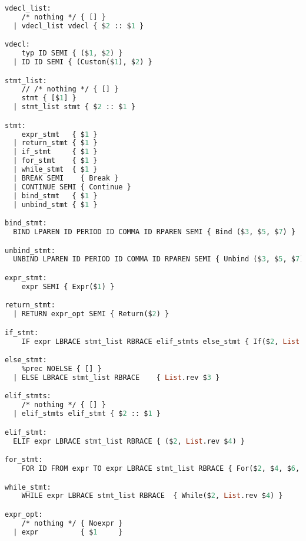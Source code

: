 \begin{lstlisting}[language=Caml,backgroundcolor=\color{backgroundcolor}]
vdecl_list:
    /* nothing */ { [] }
  | vdecl_list vdecl { $2 :: $1 }

vdecl:
    typ ID SEMI { ($1, $2) }
  | ID ID SEMI { (Custom($1), $2) }

stmt_list:
    // /* nothing */ { [] }
    stmt { [$1] }
  | stmt_list stmt { $2 :: $1 }

stmt:
    expr_stmt   { $1 }
  | return_stmt { $1 }
  | if_stmt     { $1 }
  | for_stmt    { $1 }
  | while_stmt  { $1 }
  | BREAK SEMI    { Break }
  | CONTINUE SEMI { Continue }
  | bind_stmt   { $1 }
  | unbind_stmt { $1 }

bind_stmt:
  BIND LPAREN ID PERIOD ID COMMA ID RPAREN SEMI { Bind ($3, $5, $7) }

unbind_stmt:
  UNBIND LPAREN ID PERIOD ID COMMA ID RPAREN SEMI { Unbind ($3, $5, $7) }

expr_stmt:
    expr SEMI { Expr($1) }

return_stmt:
  | RETURN expr_opt SEMI { Return($2) }

if_stmt:
    IF expr LBRACE stmt_list RBRACE elif_stmts else_stmt { If($2, List.rev $4, $6, $7) }

else_stmt:
    %prec NOELSE { [] }
  | ELSE LBRACE stmt_list RBRACE    { List.rev $3 }

elif_stmts:
    /* nothing */ { [] }
  | elif_stmts elif_stmt { $2 :: $1 }

elif_stmt:
  ELIF expr LBRACE stmt_list RBRACE { ($2, List.rev $4) }

for_stmt:
    FOR ID FROM expr TO expr LBRACE stmt_list RBRACE { For($2, $4, $6, List.rev $8) }

while_stmt:
    WHILE expr LBRACE stmt_list RBRACE  { While($2, List.rev $4) }

expr_opt:
    /* nothing */ { Noexpr }
  | expr          { $1     }


\end{lstlisting}
